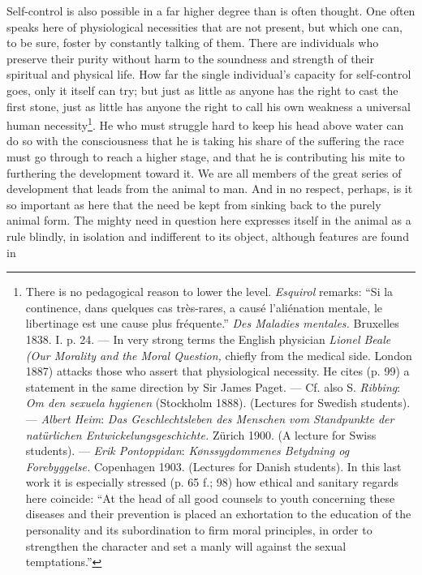 \documentclass[12pt,a4paper,openany]{book}
\newcommand{\opage}[1]{\marginnote{\footnotesize\textit{[#1]}}}
\begin{document}
Self-control is also possible in a far higher degree than is often thought. One often speaks here of physiological
necessities that are not present, but which one can, to be sure, foster by constantly talking of them. There are
individuals who preserve their purity without harm to the soundness and strength of their spiritual and physical
life. How far the single individual's capacity for self-control goes, only it itself can try; but just as little as
anyone has the right to cast the first stone, just as little has anyone the right to call his own weakness a
universal human necessity\footnote[1]{There is no pedagogical reason to lower the level. \emph{Esquirol} remarks:
``Si la continence, dans quelques cas très-rares, a causé l'aliénation mentale, le libertinage est une cause plus
fréquente.'' \textit{Des Maladies mentales.} Bruxelles 1838. I. p. 24. --- In very strong terms the English
physician \emph{Lionel Beale} \textit{(Our Morality and the Moral Question,} chiefly from the medical side. London
1887) attacks those who assert that physiological necessity. He cites (p. 99) a statement in the same direction by
Sir James Paget. --- Cf. also S. \emph{Ribbing}: \textit{Om den sexuela hygienen} (Stockholm 1888). (Lectures for
Swedish students). --- \emph{Albert Heim}: \textit{Das Geschlechtsleben des Menschen vom Standpunkte der natürlichen Entwickelungsgeschichte.} Zürich 1900. (A lecture for Swiss students). --- \emph{Erik Pontoppidan}:
\textit{Kønssygdommenes Betydning og Forebyggelse.} Copenhagen 1903. (Lectures for Danish students). In this last
work it is especially stressed (p. 65 f.; 98) how ethical and sanitary regards here coincide: ``At the head of all
good counsels to youth concerning these diseases and their prevention is placed an exhortation to the education of
the personality and its subordination to firm moral principles, in order to strengthen the character and set a
manly will against the sexual temptations.''}. He who must struggle hard to keep his head above water can do so with
the
\opage{229}consciousness that he is taking his share of the suffering the race must go through to reach a higher
stage, and that he is contributing his mite to furthering the development toward it. We are all members of the
great series of development that leads from the animal to man. And in no respect, perhaps, is it so important as
here that the need be kept from sinking back to the purely animal form. The mighty need in question here expresses
itself in the animal as a rule blindly, in isolation and indifferent to its object, although features are found in
\end{document}
